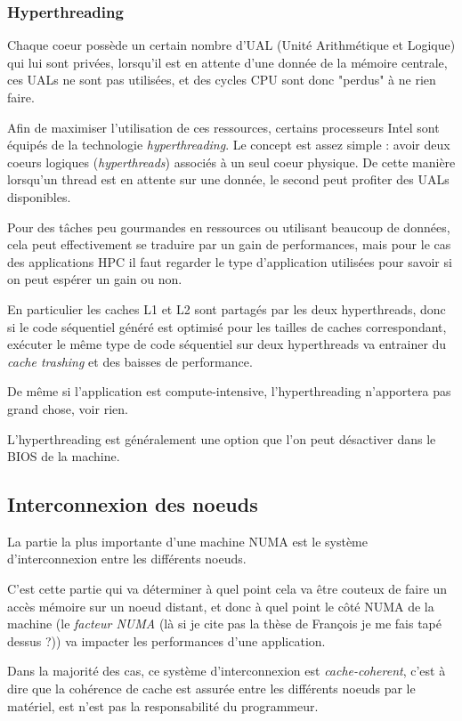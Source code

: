 \subsubsection{Hyperthreading}

Chaque coeur possède un certain nombre d'UAL (Unité Arithmétique et Logique) qui lui sont privées, lorsqu'il est en attente d'une donnée de la mémoire centrale, ces UALs ne sont pas utilisées, et des cycles CPU sont donc "perdus" à ne rien faire.

Afin de maximiser l'utilisation de ces ressources, certains processeurs Intel sont équipés de la technologie \emph{hyperthreading}.
Le concept est assez simple : avoir deux coeurs logiques (\emph{hyperthreads}) associés à un seul coeur physique.
De cette manière lorsqu'un thread est en attente sur une donnée, le second peut profiter des UALs disponibles.

Pour des tâches peu gourmandes en ressources ou utilisant beaucoup de données, cela peut effectivement se traduire par un gain de performances, mais pour le cas des applications HPC il faut regarder le type d'application utilisées pour savoir si on peut espérer un gain ou non.

En particulier les caches L1 et L2 sont partagés par les deux hyperthreads, donc si le code séquentiel généré est optimisé pour les tailles de caches correspondant, exécuter le même type de code séquentiel sur deux hyperthreads va entrainer du \emph{cache trashing} et des baisses de performance.

De même si l'application est compute-intensive, l'hyperthreading n'apportera pas grand chose, voir rien.

L'hyperthreading est généralement une option que l'on peut désactiver dans le BIOS de la machine.


\subsection{Interconnexion des noeuds}

La partie la plus importante d'une machine NUMA est le système d'interconnexion entre les différents noeuds.

C'est cette partie qui va déterminer à quel point cela va être couteux de faire un accès mémoire sur un noeud distant, et donc à quel point le côté NUMA de la machine (le \emph{facteur NUMA} (là si je cite pas la thèse de François je me fais tapé dessus ?)) va impacter les performances d'une application.

Dans la majorité des cas, ce système d'interconnexion est \emph{cache-coherent}, c'est à dire que la cohérence de cache est assurée entre les différents noeuds par le matériel, est n'est pas la responsabilité du programmeur.

